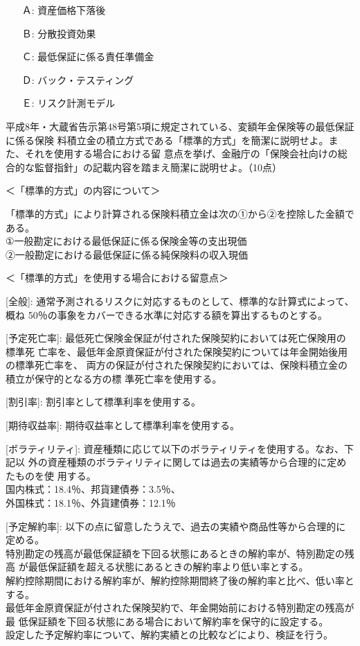 \documentclass[report,gutter=10mm,fore-edge=10mm,uplatex,dvipdfmx]{jlreq}
\begin{document}
\answer{}
\begin{itemize}
\item[ Ａ: ] 資産価格下落後
\item[ Ｂ: ] 分散投資効果
\item[ Ｃ: ] 最低保証に係る責任準備金
\item[ Ｄ: ] バック・テスティング
\item[ Ｅ: ] リスク計測モデル
\end{itemize}

平成8年・大蔵省告示第48号第5項に規定されている、変額年金保険等の最低保証に係る保険
料積立金の積立方式である「標準的方式」を簡潔に説明せよ。また、それを使用する場合における留
意点を挙げ、金融庁の「保険会社向けの総合的な監督指針」の記載内容を踏まえ簡潔に説明せよ。（10点）

\answer{}
＜「標準的方式」の内容について＞

「標準的方式」により計算される保険料積立金は次の①から②を控除した金額である。\\
①一般勘定における最低保証に係る保険金等の支出現価\\
②一般勘定における最低保証に係る純保険料の収入現価

＜「標準的方式」を使用する場合における留意点＞

[全般]: 通常予測されるリスクに対応するものとして、標準的な計算式によって、概ね
50％の事象をカバーできる水準に対応する額を算出するものとする。

[予定死亡率]: 最低死亡保険金保証が付された保険契約においては死亡保険用の標準死
亡率を、最低年金原資保証が付された保険契約については年金開始後用の標準死亡率を、
両方の保証が付された保険契約においては、保険料積立金の積立が保守的となる方の標
準死亡率を使用する。

[割引率]: 割引率として標準利率を使用する。

[期待収益率]: 期待収益率として標準利率を使用する。

[ボラティリティ]: 資産種類に応じて以下のボラティリティを使用する。なお、下記以
外の資産種類のボラティリティに関しては過去の実績等から合理的に定めたものを使
用する。\\
国内株式：18.4％、邦貨建債券：3.5％、\\
外国株式：18.1％、外貨建債券：12.1％

[予定解約率]: 以下の点に留意したうえで、過去の実績や商品性等から合理的に定める。\\
特別勘定の残高が最低保証額を下回る状態にあるときの解約率が、特別勘定の残高
が最低保証額を超える状態にあるときの解約率より低い率とする。\\
解約控除期間における解約率が、解約控除期間終了後の解約率と比べ、低い率とする。\\
最低年金原資保証が付された保険契約で、年金開始前における特別勘定の残高が最
低保証額を下回る状態にある場合において解約率を保守的に設定する。\\
設定した予定解約率について、解約実績との比較などにより、検証を行う。
\end{document}
